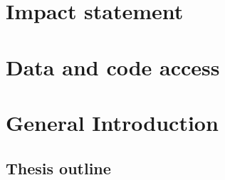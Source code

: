 \documentclass[11pt]{report}
\begin{document}

\chapter*{Impact statement}

\chapter*{Data and code access}




\clearpage
\tableofcontents

\clearpage
\listoftables

\clearpage
\listoffigures


%


\clearpage
\chapter{General Introduction}
%


\section*{Thesis outline}
\end{document}
